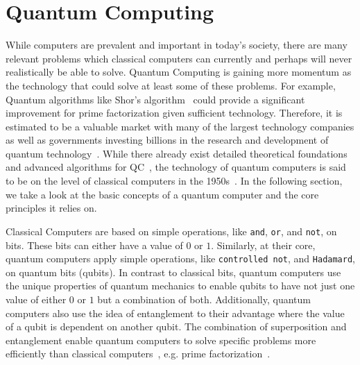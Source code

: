 \section{Quantum Computing}
While computers are prevalent and important in today's society, there are many relevant problems which classical computers can currently and perhaps will never realistically be able to solve. Quantum Computing is gaining more momentum as the technology that could solve at least some of these problems. For example, Quantum algorithms like Shor's algorithm~\cite{Shor97} could provide a significant improvement for prime factorization given sufficient technology. Therefore, it is estimated to be a valuable market with many of the largest technology companies as well as governments investing billions in the research and development of quantum technology~\cite{RDB*22}. While there already exist detailed theoretical foundations~\cite{van20, Ying11,YYF12} and advanced algorithms for QC~\cite{ACR*10,BGB*18,LoCh19,Shor97}, the technology of quantum computers is said to be on the level of classical computers in the 1950s~\cite{CFM17}. In the following section, we take a look at the basic concepts of a quantum computer and the core principles it relies on.

Classical Computers are based on simple operations, like \texttt{and}, \texttt{or}, and \texttt{not}, on bits. These bits can either have a value of $0$ or $1$. Similarly, at their core, quantum computers apply simple operations, like \texttt{controlled not}, and \texttt{Hadamard}, on quantum bits (qubits). In contrast to classical bits, quantum computers use the unique properties of quantum mechanics to enable qubits to have not just one value of either $0$ or $1$ but a combination of both. Additionally, quantum computers also use the idea of entanglement to their advantage where the value of a qubit is dependent on another qubit. The combination of superposition and entanglement enable quantum computers to solve specific problems more efficiently than classical computers~\cite{RDB*22}, e.g. prime factorization~\cite{Shor97}.


